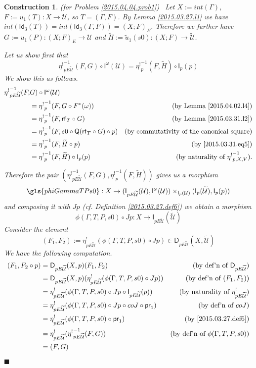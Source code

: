 \documentclass[12pt]{article}
\numberwithin{equation}{section}
\newtheorem{construction0}[proposition]{Construction}
\newenvironment{construction}[1]{\begin{construction0}(for Problem \ref{#1})\ }{$\blacksquare$ \end{construction0}}
\newcommand{\by}[1]{\text{(by #1)}}
\newcommand{\sr}{\rightarrow}
\newcommand{\wt}{\widetilde}
\newcommand{\Idx}{\mathsf{Id}_3} %
\newcommand{\U}{\mathcal{U}}
\newcommand{\D}{\mathsf{D}}
\newcommand{\I}{\mathsf{I}}
\newcommand{\rf}{\mathsf{rf}}
\newcommand{\Q}{\mathsf{Q}}
\newcommand{\etashriek}{\eta^!}
\newcommand{\etaunshriek}{{\etashriek}^{-1}}
\newcommand{\pr}{\mathsf{pr}}
\begin{document}
\begin{construction}{2015.04.04.prob1}\rm
\label{2015.04.04.constr1} Let $X:=int(\Gamma)$, $F:=u_1(T):X\sr \U$, so $T = (\Gamma,F)$. By Lemma
\ref{2015.03.27.l1} we have
$int(\Idx(T))=int(\Idx(\Gamma,F))=(X;F)_{E}$. Therefore we further
have $G:=u_1(P):(X;F)_{E}\sr \U$ and $\wt{H}:=\wt{u}_1(s0):(X;F)\sr
\wt{\U}$.

Let us show first that
%
$$\etaunshriek_{pE\wt{\U}}(F,G)\circ \I^{\omega}(\U)=\etaunshriek_p(F,\wt{H})\circ \I_p(p)$$
%
We show this as follows.
%
\begin{align*}
  \etaunshriek_{pE\wt{\U}}(F,&G) \circ \I^{\omega}(\U) \\
    & = \etaunshriek_p(F,G\circ F^*(\omega)) & \by{Lemma \ref{2015.04.02.l4}} \\
    & = \etaunshriek_p(F,\rf_T\circ G) & \by{Lemma \ref{2015.03.31.l2}}  \\
    & = \etaunshriek_p(F,s0\circ \Q(\rf_T\circ G)\circ p) & \by{commutativity of the canonical square}  \\
    & = \etaunshriek_p(F,\wt{H}\circ p) & \by{\ref{2015.03.31.eq5}}  \\
    & = \etaunshriek_p(F,\wt{H})\circ \I_p(p) & \by{naturality of $\etaunshriek_{p,X,V}$}.
\end{align*}

Therefore the pair $(\etaunshriek_{pE\wt{\U}}(F,G),\etaunshriek_p(F,\wt{H}))$ gives us a
morphism
%
$$\gls{phiGammaTPs0} : X \sr (\I_{pE\wt{\U}}(\U), \I^{\omega}(\U)) \times_{\I_p(\U)}
(\I_p(\wt{\U}),\I_p(p))$$
%
and composing it with $Jp$ (cf. Definition \ref{2015.03.27.def6}) we obtain a
morphism
%
$$\phi(\Gamma,T,P,s0)\circ Jp: X\sr \I_{pE\wt{\U}}(\wt{\U})$$
%
Consider the element
%
$$(F_1,F_2) := \etashriek_{pE\wt{\U}}(\phi(\Gamma,T,P,s0)\circ Jp)\in
\D_{pE\wt{\U}}(X,\wt{\U})$$
%
We have the following computation.
%
\begin{align*}
  (F_1,F_2\circ p)
  & = \D_{pE\wt{\U}}(X,p)(F_1,F_2)  & \by{def'n of $\D_{pE\wt{\U}}$} \\
  & = \D_{pE\wt{\U}}(X,p)(\etashriek_{pE\wt{\U}}(\phi(\Gamma,T,P,s0)\circ Jp))  & \by{def'n of $(F_1,F_2)$} \\
  & = \etashriek_{pE\wt{\U}}(\phi(\Gamma,T,P,s0)\circ Jp\circ \I_{pE\wt{\U}}(p))  & \by{naturality of $\etashriek_{pE\wt{\U}}$} \\
  & = \etashriek_{pE\wt{\U}}(\phi(\Gamma,T,P,s0)\circ Jp\circ coJ \circ \pr_1)  & \by{def'n of $coJ$} \\
  & = \etashriek_{pE\wt{\U}}(\phi(\Gamma,T,P,s0)\circ \pr_1)  & \by{\ref{2015.03.27.def6}} \\
  & = \etashriek_{pE\wt{\U}}(\etaunshriek_{pE\wt{\U}}(F,G)) & \by{def'n of $\phi(\Gamma,T,P,s0)$} \\
  & =(F,G)
\end{align*}


\end{construction}
\end{document}
